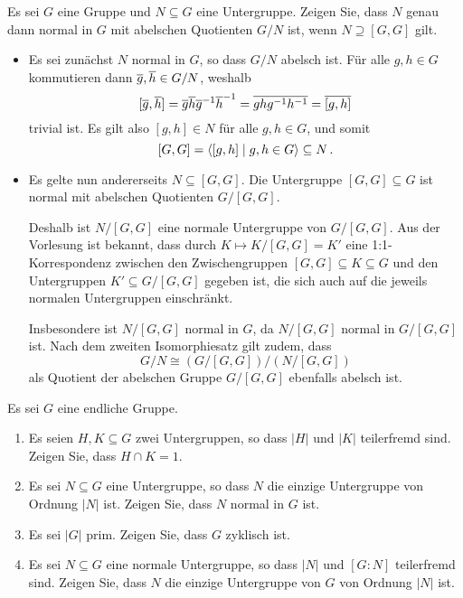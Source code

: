 \begin{question}[subtitle = Abelsche Quotienten]
  Es sei $G$ eine Gruppe und $N \subseteq G$ eine Untergruppe.
  Zeigen Sie, dass $N$ genau dann normal in $G$ mit abelschen Quotienten $G/N$ ist, wenn $N \supseteq [G,G]$ gilt.
\end{question}


\begin{solution}
  \begin{itemize}
    \item
      Es sei zunächst $N$ normal in $G$, so dass $G/N$ abelsch ist.
      Für alle $g, h \in G$ kommutieren dann $\overline{g}, \overline{h} \in G/N$, weshalb
      \[
          [\overline{g}, \overline{h}]
        = \overline{g} \overline{h} \overline{g}^{-1} \overline{h}^{-1}
        = \overline{g h g^{-1} h^{-1}}
        = \overline{[g,h]}
      \]
      trivial ist.
      Es gilt also $[g,h] \in N$ für alle $g, h \in G$, und somit
      \[
                  [G,G]
        =         \langle [g,h] \mid g, h \in G \rangle
        \subseteq N \,.
      \]
    \item
      Es gelte nun andererseits $N \subseteq [G,G]$.
      Die Untergruppe $[G,G] \subseteq G$ ist normal mit abelschen Quotienten $G/[G,G]$.
      
      Deshalb ist $N/[G,G]$ eine normale Untergruppe von $G/[G,G]$.
      Aus der Vorlesung ist bekannt, dass durch $K \mapsto K/[G,G] = K'$ eine 1:1-Korrespondenz zwischen den Zwischengruppen $[G,G] \subseteq K \subseteq G$ und den Untergruppen $K' \subseteq G/[G,G]$ gegeben ist, die sich auch auf die jeweils normalen Untergruppen einschränkt.
      
      Insbesondere ist $N/[G,G]$ normal in $G$, da $N/[G,G]$ normal in $G/[G,G]$ ist.
      Nach dem zweiten Isomorphiesatz gilt zudem, dass
      \[
              G/N
        \cong (G/[G,G])/(N/[G,G])
      \]
      als Quotient der abelschen Gruppe $G/[G,G]$ ebenfalls abelsch ist.
  \end{itemize}
\end{solution}


\begin{question}[subtitle = Zur Ordnung]
  \label{question: basic calculatings with orders}
  Es sei $G$ eine endliche Gruppe.
  \begin{enumerate}
    \item
      Es seien $H, K \subseteq G$ zwei Untergruppen, so dass $|H|$ und $|K|$ teilerfremd sind.
      Zeigen Sie, dass $H \cap K = 1$.
    \item
      Es sei $N \subseteq G$ eine Untergruppe, so dass $N$ die einzige Untergruppe von Ordnung $|N|$ ist.
      Zeigen Sie, dass $N$ normal in $G$ ist.
    \item
      Es sei $|G|$ prim.
      Zeigen Sie, dass $G$ zyklisch ist.
    \item
      Es sei $N \subseteq G$ eine normale Untergruppe, so dass $|N|$ und $[G : N]$ teilerfremd sind.
      Zeigen Sie, dass $N$ die einzige Untergruppe von $G$ von Ordnung $|N|$ ist.
  \end{enumerate}
\end{question}


